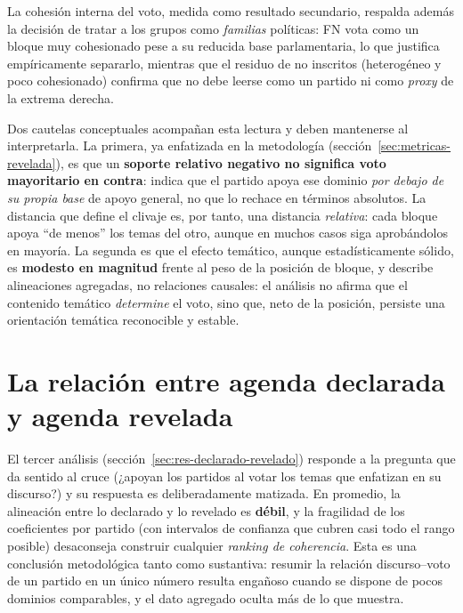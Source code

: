 La cohesión interna del voto, medida como resultado secundario, respalda además
la decisión de tratar a los grupos como \emph{familias} políticas: FN vota como
un bloque muy cohesionado pese a su reducida base parlamentaria, lo que justifica
empíricamente separarlo, mientras que el residuo de no inscritos (heterogéneo y
poco cohesionado) confirma que no debe leerse como un partido ni como
\emph{proxy} de la extrema derecha.

Dos cautelas conceptuales acompañan esta lectura y deben mantenerse al
interpretarla. La primera, ya enfatizada en la metodología
(sección~\ref{sec:metricas-revelada}), es que un \textbf{soporte relativo
negativo no significa voto mayoritario en contra}: indica que el partido apoya
ese dominio \emph{por debajo de su propia base} de apoyo general, no que lo
rechace en términos absolutos. La distancia que define el clivaje es, por tanto,
una distancia \emph{relativa}: cada bloque apoya ``de menos'' los temas del otro,
aunque en muchos casos siga aprobándolos en mayoría. La segunda es que el efecto
temático, aunque estadísticamente sólido, es \textbf{modesto en magnitud} frente
al peso de la posición de bloque, y describe alineaciones agregadas, no
relaciones causales: el análisis no afirma que el contenido temático
\emph{determine} el voto, sino que, neto de la posición, persiste una orientación
temática reconocible y estable.

\section{La relación entre agenda declarada y agenda revelada}
\label{sec:disc-declarado-revelado}

El tercer análisis (sección~\ref{sec:res-declarado-revelado}) responde a la
pregunta que da sentido al cruce (¿apoyan los partidos al votar los temas que
enfatizan en su discurso?) y su respuesta es deliberadamente matizada. En
promedio, la alineación entre lo declarado y lo revelado es \textbf{débil}, y la
fragilidad de los coeficientes por partido (con intervalos de confianza que
cubren casi todo el rango posible) desaconseja construir cualquier \emph{ranking
de coherencia}. Esta es una conclusión metodológica tanto como sustantiva:
resumir la relación discurso--voto de un partido en un único número resulta
engañoso cuando se dispone de pocos dominios comparables, y el dato agregado
oculta más de lo que muestra.

